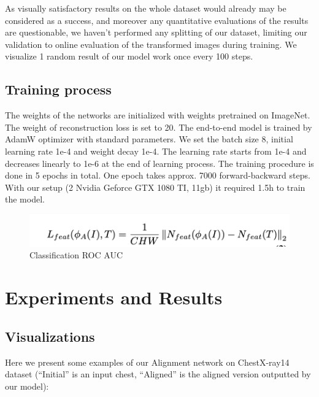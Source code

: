 \documentclass{article}
\begin{document}
As visually satisfactory results on the whole dataset would already may be 
considered as a success, and moreover any quantitative evaluations of the 
results are questionable, we haven't performed any splitting of our dataset, 
limiting our validation to online evaluation of the transformed images during 
training. We visualize 1 random result of our model work once every 100 steps.

\subsection{Training process}
The weights of the networks are initialized with weights pretrained on ImageNet. 
The weight of reconstruction loss is set to 20. The end-to-end model is trained 
by AdamW optimizer with standard parameters. We set the batch size 8, initial 
learning rate 1e-4 and weight decay 1e-4. The learning rate starts from 1e-4 
and decreases linearly to 1e-6 at the end of learning process. The training 
procedure is done in 5 epochs in total. One epoch takes approx. 7000 
forward-backward steps. With our setup (2 Nvidia Geforce GTX 1080 TI, 11gb) it 
required 1.5h to train the model.

\begin{figure}[ht]\label{classification}
     \vskip 0.2in
     \begin{center}
     \centerline{\includegraphics[width=\columnwidth * 2]{../images/classification.png}}
     \caption{Classification ROC AUC}
     \end{center}
     \vskip -0.2in
\end{figure}

\section{Experiments and Results}\label{experiments_and_results}

\subsection{Visualizations}

Here we present some examples of our Alignment network on ChestX-ray14 dataset 
 (``Initial'' is an input chest, ``Aligned'' is the aligned version outputted by our model):
 
\end{document}
